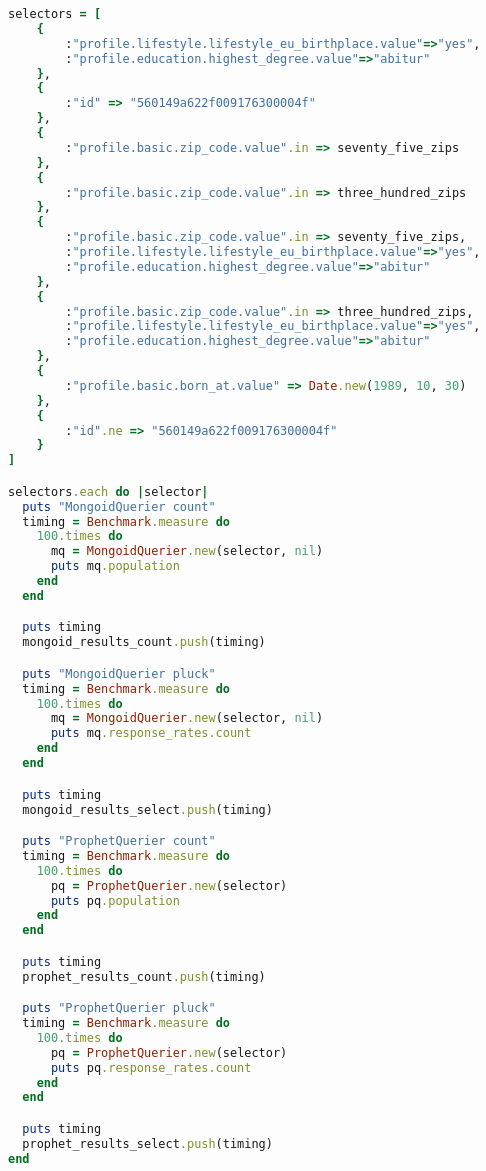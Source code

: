 \begin{appendix}
\begin{lstlisting}[language=Ruby]
selectors = [
    { 
        :"profile.lifestyle.lifestyle_eu_birthplace.value"=>"yes",
        :"profile.education.highest_degree.value"=>"abitur" 
    },
    { 
        :"id" => "560149a622f009176300004f" 
    },
    { 
        :"profile.basic.zip_code.value".in => seventy_five_zips 
    },
    { 
        :"profile.basic.zip_code.value".in => three_hundred_zips
    },
    { 
        :"profile.basic.zip_code.value".in => seventy_five_zips,
        :"profile.lifestyle.lifestyle_eu_birthplace.value"=>"yes", 
        :"profile.education.highest_degree.value"=>"abitur" 
    },
    { 
        :"profile.basic.zip_code.value".in => three_hundred_zips,
        :"profile.lifestyle.lifestyle_eu_birthplace.value"=>"yes", 
        :"profile.education.highest_degree.value"=>"abitur" 
    },
    { 
        :"profile.basic.born_at.value" => Date.new(1989, 10, 30) 
    },
    { 
        :"id".ne => "560149a622f009176300004f" 
    }
]

selectors.each do |selector|
  puts "MongoidQuerier count"
  timing = Benchmark.measure do
    100.times do
      mq = MongoidQuerier.new(selector, nil)
      puts mq.population
    end
  end

  puts timing
  mongoid_results_count.push(timing)

  puts "MongoidQuerier pluck"
  timing = Benchmark.measure do
    100.times do
      mq = MongoidQuerier.new(selector, nil)
      puts mq.response_rates.count
    end
  end

  puts timing
  mongoid_results_select.push(timing)

  puts "ProphetQuerier count"
  timing = Benchmark.measure do
    100.times do
      pq = ProphetQuerier.new(selector)
      puts pq.population
    end
  end

  puts timing
  prophet_results_count.push(timing)

  puts "ProphetQuerier pluck"
  timing = Benchmark.measure do
    100.times do
      pq = ProphetQuerier.new(selector)
      puts pq.response_rates.count
    end
  end

  puts timing
  prophet_results_select.push(timing)
end

\end{lstlisting}

\end{appendix}
